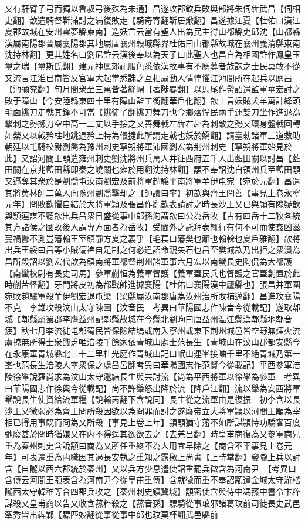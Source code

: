 又有馯臂子弓而獨以魯叔弓後殊為未通】昌遂攻郡欽兵敗與部將朱伺犇武昌【伺相吏翻】歆遣騎督靳滿討之滿復敗走【騎奇寄翻靳居焮翻】昌遂據江夏【杜佑曰漢江夏郡故城在安州雲夢縣柬南】造妖言云當有聖人出為民主得山都縣吏邱沈【山都縣漢屬南陽郡晉屬襄陽郡其地屬唐襄州穀城縣界杜佑曰山都縣故城在襄州義清縣東南沈持林翻】更其姓名曰劉尼詐云漢後奉以為天子曰此聖人也昌自為相國詐作鳳皇玉璽之瑞【璽斯氏翻】建元神鳳郊祀服色悉依漢故事有不應募者族誅之士民莫敢不從又流言江淮已南皆反官軍大起當悉誅之互相扇動人情惶懼江沔間所在起兵以應昌【沔彌兖翻】旬月間衆至三萬皆著絳㡌【著陟畧翻】以馬尾作髯詔遣監軍華宏討之敗于障山【今安陸縣東四十里有障山監工銜翻華戶化翻】歆上言妖賊犬羊萬計絳頭毛面挑刀走戟其鋒不可當【挑徒了翻挑刀舞刀也今鄉落悍民兩手運雙刀坐作進退為擊刺之勢擲刀空中高一二丈以手接之又善舞戟左犇右赴為刺敵之勢又環身盤戟回轉如縈又以戟矜柱地跳過矜上特為儇捷此所謂走戟也妖於嬌翻】請臺勑諸軍三道救助朝廷以屯騎校尉劉喬為豫州刺史寧朔將軍沛國劉宏為荆州刺史【寧朔將軍始見於此】又詔河間王顒遣雍州刺史劉沈將州兵萬人并征西府五千人出藍田關以討昌【藍田關在京兆藍田縣即秦之嶢關也雍於用翻沈持林翻】顒不奉詔沈自領州兵至藍田顒又逼奪其衆於是劉喬屯汝南劉宏及前將軍趙驤平南將軍羊伊屯宛【宛於元翻】昌遣其將黄林帥二萬人向豫州劉喬擊却之【帥讀曰率】初歆與齊王冏善【事見上卷永寧元年】冏敗歆懼自結於大將軍頴及張昌作亂歆表請討之時長沙王乂已與頴有隙疑歆與頴連謀不聽歆出兵昌衆日盛從事中郎孫洵謂歆曰公為岳牧【古有四岳十二牧各統其方諸侯之國故後人謂專方面者為岳牧】受閫外之託拜表輒行有何不可而使姦凶滋蔓禍釁不測豈藩翰王室鎮靜方夏之義乎【毛萇曰藩樊也籬也翰榦也夏戶雅翻】歆將出兵王綏曰昌等小賊偏禆自足制之何必違詔命親矢石也昌至樊城歆乃出拒之衆潰為昌所殺詔以劉宏代歆為鎮南將軍都督荆州諸軍事六月宏以南蠻長史陶侃為大都護【南蠻校尉有長史司馬】參軍蒯恒為義軍督護【義軍蓋民兵也督護之官蓋創置於此時蒯苦怪翻】牙門將皮初為都戰帥進據襄陽【杜佑曰襄陽漢中廬縣也】張昌并軍圍宛敗趙驤軍殺羊伊劉宏退屯梁【梁縣屬汝南郡唐為汝州治所敗補邁翻】昌進攻襄陽不克　李雄攻殺汶山太守陳圖【汶音民　考異曰華陽國志作陳旹今從載記】遂取郫城【郫縣屬蜀郡李膺益州記郫縣故城在今縣北劉昫曰唐益州温江縣漢郫縣地郫音疲】秋七月李流徙屯郫蜀民皆保險結塢或南入寧州或東下荆州城邑皆空野無煙火流虜掠無所得士衆饑乏唯涪陵千餘家依青城山處士范長生【青城山在汶山郡都安縣今在永康軍青城縣北三十二里杜光庭作青城山記曰岷山連峯接岫千里不絶青城乃第一峯也范長生涪陵人率衆保之處昌呂翻考異曰華陽國志作范賢今從載記】平西參軍涪陵徐轝說羅尚求為汶山太守邀結長生與共討流【尚為平西將軍以徐轝為參軍　考異曰華陽國志作徐輿今從載記】尚不許轝怒出降於流【降戶江翻】流以轝為安西將軍轝說長生使資給流軍糧【說輸芮翻下含說同】長生從之流軍由是復振　初李含以長沙王乂微弱必為齊王冏所殺因欲以為冏罪而討之遂廢帝立大將軍頴以河間王顒為宰相已得用事既而冏為乂所殺【事見上卷上年】頴顒猶守藩不如所謀頴恃功驕奢百度弛廢甚於冏時猶嫌乂在内不得逞其欲欲去之【去羌呂翻】時皇甫商復為乂參軍商兄重為秦州刺史含說顒曰商為乂所任重終不為人用宜早除之【商含不平事見上卷元年】可表遷重為内職因其過長安執之重知之露檄上尚書【上時掌翻】發隴上兵以討含【自隴以西六郡統於秦州】乂以兵方少息遣使詔重罷兵徵含為河南尹　【考異曰含傳云河間王顒表含為河南尹今從皇甫重傳】含就徵而重不奉詔顒遣金城太守游楷隴西太守韓稚等合四郡兵攻之【秦州刺史鎮冀城】顒密使含與侍中馮蓀中書令卞粹謀殺乂皇甫商以告乂收含蓀粹殺之【蓀音孫】驃騎從事琅邪諸葛玟前司徒長史武邑牽秀皆出犇鄴【驃匹妙翻從事從事中郎也玟莫杯翻武邑縣前